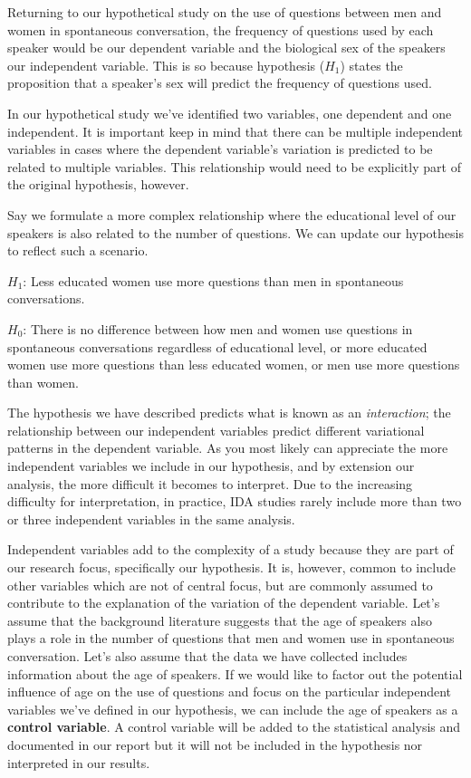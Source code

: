 \documentclass[
  letterpaper,
]{scrbook}
\begin{document}
Returning to our hypothetical study on the use of questions between men
and women in spontaneous conversation, the frequency of questions used
by each speaker would be our dependent variable and the biological sex
of the speakers our independent variable. This is so because hypothesis
(\(H_1\)) states the proposition that a speaker's sex will predict the
frequency of questions used.

In our hypothetical study we've identified two variables, one dependent
and one independent. It is important keep in mind that there can be
multiple independent variables in cases where the dependent variable's
variation is predicted to be related to multiple variables. This
relationship would need to be explicitly part of the original
hypothesis, however.

Say we formulate a more complex relationship where the educational level
of our speakers is also related to the number of questions. We can
update our hypothesis to reflect such a scenario.

\(H_1\): Less educated women use more questions than men in spontaneous
conversations.

\(H_0\): There is no difference between how men and women use questions
in spontaneous conversations regardless of educational level, or more
educated women use more questions than less educated women, or men use
more questions than women.

The hypothesis we have described predicts what is known as an
\emph{interaction}; the relationship between our independent variables
predict different variational patterns in the dependent variable. As you
most likely can appreciate the more independent variables we include in
our hypothesis, and by extension our analysis, the more difficult it
becomes to interpret. Due to the increasing difficulty for
interpretation, in practice, IDA studies rarely include more than two or
three independent variables in the same analysis.

Independent variables add to the complexity of a study because they are
part of our research focus, specifically our hypothesis. It is, however,
common to include other variables which are not of central focus, but
are commonly assumed to contribute to the explanation of the variation
of the dependent variable. Let's assume that the background literature
suggests that the age of speakers also plays a role in the number of
questions that men and women use in spontaneous conversation. Let's also
assume that the data we have collected includes information about the
age of speakers. If we would like to factor out the potential influence
of age on the use of questions and focus on the particular independent
variables we've defined in our hypothesis, we can include the age of
speakers as a \textbf{control variable}. A control variable will be
added to the statistical analysis and documented in our report but it
will not be included in the hypothesis nor interpreted in our results.
\end{document}

